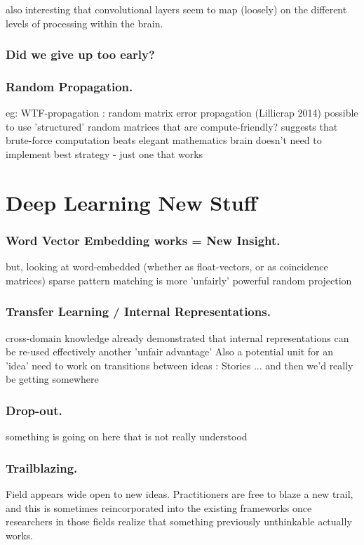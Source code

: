 \documentclass[citeauthoryear]{llncs}
\begin{document}
also interesting that convolutional layers seem to map (loosely) on the 
different levels of processing within the brain.

\subsubsection*{Did we give up too early?}
 
\subsubsection*{Random Propagation.}
    eg: WTF-propagation : random matrix error propagation (Lillicrap 2014)
      possible to use 'structured' random matrices that are compute-friendly?
      suggests that brute-force computation beats elegant mathematics
        brain doesn't need to implement best strategy - just one that works

 
\section{Deep Learning New Stuff}


\subsubsection*{Word Vector Embedding works = New Insight.}
    but, looking at word-embedded (whether as float-vectors, or as coincidence matrices)
      sparse pattern matching is more 'unfairly' powerful 
      random projection

\subsubsection*{Transfer Learning / Internal Representations.}
  cross-domain knowledge
    already demonstrated that internal representations can be re-used effectively
    another 'unfair advantage'
  Also a potential unit for an 'idea'
    need to work on transitions between ideas : Stories
      ... and then we'd really be getting somewhere


\subsubsection*{Drop-out.}
    something is going on here that is not really understood

\subsubsection*{Trailblazing.}
Field appears wide open to new ideas.  Practitioners are free to blaze a new trail, 
and this is sometimes reincorporated into the existing frameworks once 
researchers in those fields realize that something previously unthinkable actually works.
\end{document}
